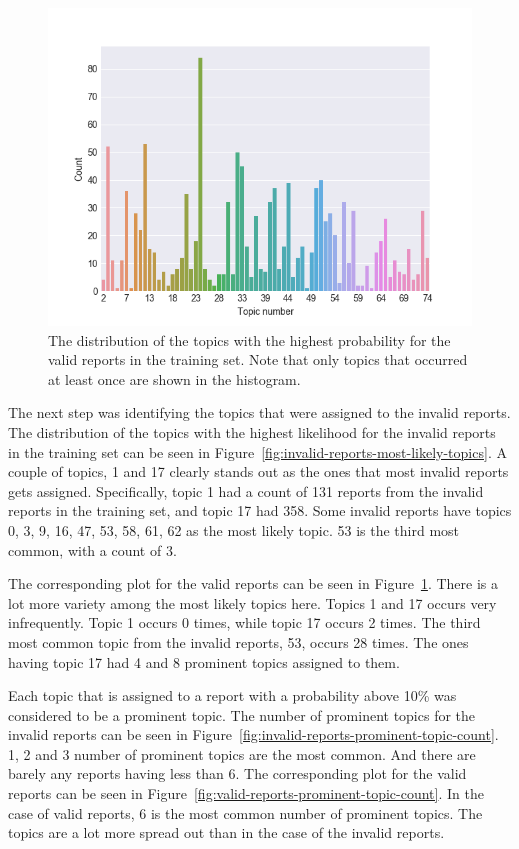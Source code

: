 \begin{figure}
    \centering
    \includegraphics[scale=0.9]{figures/valid_reports_most_likely_topics_histogram.png}
    \caption{The distribution of the topics with the highest probability for the valid reports in the training set. Note that only topics that occurred at least once are shown in the histogram.}
    \label{fig:valid-reports-most-likely-topics}
\end{figure}

The next step was identifying the topics that were assigned to the invalid reports.
The distribution of the topics with the highest likelihood for the invalid reports in the training set can be seen in Figure~\ref{fig:invalid-reports-most-likely-topics}.
A couple of topics, 1 and 17 clearly stands out as the ones that most invalid reports gets assigned.
Specifically, topic 1 had a count of 131 reports from the invalid reports in the training set, and topic 17 had 358.
Some invalid reports have topics 0, 3, 9, 16, 47, 53, 58, 61, 62 as the most likely topic.
53 is the third most common, with a count of 3.

The corresponding plot for the valid reports can be seen in Figure~\ref{fig:valid-reports-most-likely-topics}.
There is a lot more variety among the most likely topics here.
Topics 1 and 17 occurs very infrequently.
Topic 1 occurs 0 times, while topic 17 occurs 2 times.
The third most common topic from the invalid reports, 53, occurs 28 times.
The ones having topic 17 had 4 and 8 prominent topics assigned to them.

Each topic that is assigned to a report with a probability above 10\% was considered to be a prominent topic.
The number of prominent topics for the invalid reports can be seen in Figure~\ref{fig:invalid-reports-prominent-topic-count}.
1, 2 and 3 number of prominent topics are the most common.
And there are barely any reports having less than 6.
The corresponding plot for the valid reports can be seen in Figure~\ref{fig:valid-reports-prominent-topic-count}.
In the case of valid reports, 6 is the most common number of prominent topics. 
The topics are a lot more spread out than in the case of the invalid reports.

